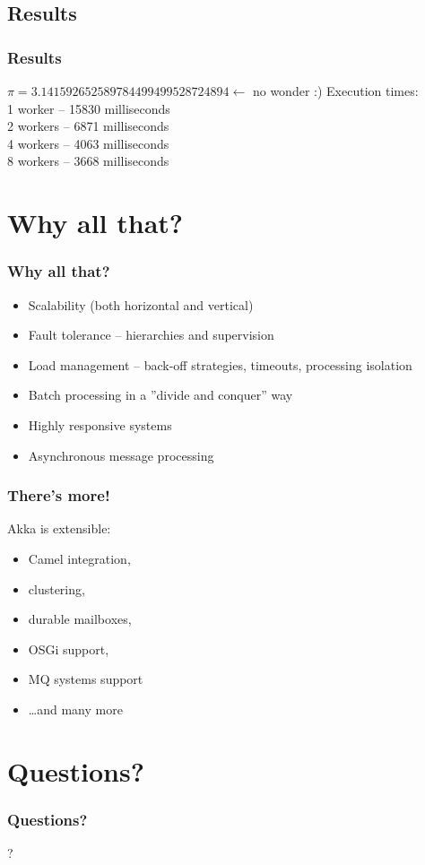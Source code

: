 \documentclass[xcolor=dvipsnames]{beamer}
\begin{document}
\subsection{Results}

\begin{frame}
\frametitle{Results}
$\pi = 3.141592652589784499499528724894 \gets$ no wonder :)
Execution times:\\
1 worker -- 15830 milliseconds\\
2 workers -- 6871 milliseconds\\
4 workers -- 4063 milliseconds\\
8 workers -- 3668 milliseconds
\end{frame}


\section{Why all that?}

\begin{frame}
\frametitle{Why all that?}
\begin{itemize}
\item Scalability (both horizontal and vertical)
\item Fault tolerance -- hierarchies and supervision
\item Load management -- back-off strategies, timeouts, processing isolation
\item Batch processing in a ''divide and conquer'' way
\item Highly responsive systems
\item Asynchronous message processing
\end{itemize}
\end{frame}

\begin{frame}
\frametitle{There's more!}
Akka is extensible:
\begin{itemize}
\item Camel integration,
\item clustering,
\item durable mailboxes,
\item OSGi support,
\item MQ systems support
\item \ldots and many more
\end{itemize}
\end{frame}

\section{Questions?}

\begin{frame}
\frametitle{Questions?}
\begin{center}
\Huge{?}
\end{center}
\end{frame}
\end{document}
